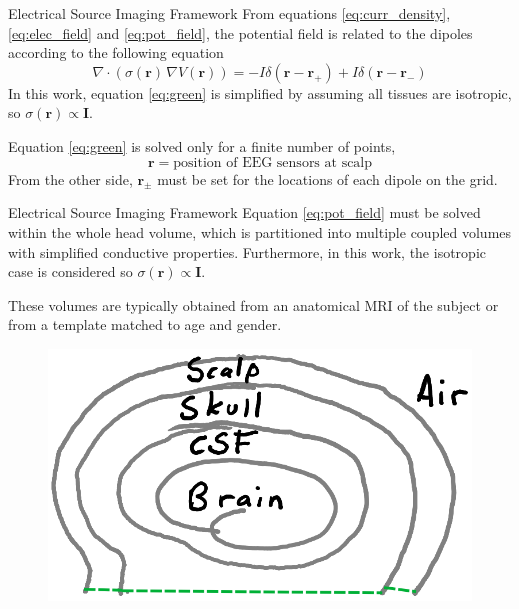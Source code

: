\documentclass[progressbar=head]{beamer}
\newcommand{\ppar}[1]{ \left( #1 \right) }
\newcommand{\id}{\mathbf{I}}
\newcommand{\rr}{\mathbf{r}}
\begin{document}
\begin{frame}{Electrical Source Imaging Framework}
From equations \eqref{eq:curr_density}, \eqref{eq:elec_field} and \eqref{eq:pot_field}, the potential field is related to the dipoles according to the following equation
\begin{equation}
\nabla \cdot\ppar{\sigma(\rr)\, \nabla V(\rr) } = 
-I \delta\ppar{\rr-\rr_+} + I \delta\ppar{\rr-\rr_-}
\label{eq:green}
\end{equation}
In this work, equation \eqref{eq:green} is simplified by assuming 
all tissues are isotropic, so $\sigma(\rr)\propto \id$.

Equation \eqref{eq:green} is solved 
only for a finite number of points, 
\begin{equation*}
    \rr = \text{position of EEG sensors at scalp}
\end{equation*}
From the other side, $\rr_\pm$ must be set for the locations of each dipole on the grid.
\end{frame}

\begin{frame}{Electrical Source Imaging Framework}
Equation \eqref{eq:pot_field} must be solved within the whole head volume, which is partitioned into multiple coupled volumes with simplified conductive properties.
Furthermore, in this work, the isotropic case is considered so 
$\sigma(\rr) \propto \id$.

These volumes are typically obtained from an anatomical MRI of the subject or from a template matched to age and gender.

\begin{figure}
\centering
\includegraphics[width=0.4\linewidth]{./img_oldbeamer/sketch06}
\end{figure}
\end{frame}
\end{document}
